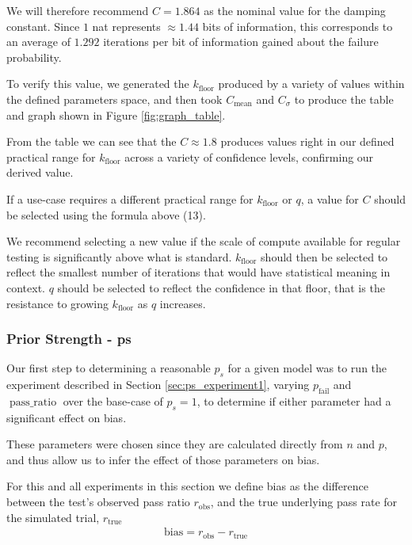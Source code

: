 We will therefore recommend $C = 1.864$ as the nominal value for the damping constant. Since $1$ nat represents $\approx 1.44$ bits of information, this corresponds to an average of $1.292$ iterations per bit of information gained about the failure probability.

To verify this value, we generated the $k_{\text{floor}}$ produced by a variety of values within the defined parameters space, and then took $C_{\text{mean}}$ and $C_{\sigma}$ to produce the table and graph shown in Figure \ref{fig:graph_table}.

From the table we can see that the $C \approx 1.8$ produces values right in our defined practical range for $k_{\text{floor}}$ across a variety of confidence levels, confirming our derived value.

If a use-case requires a different practical range for $k_{\text{floor}}$ or $q$, a value for $C$ should be selected using the formula above (13).

We recommend selecting a new value if the scale of compute available for regular testing is significantly above what is standard. $k_{\text{floor}}$ should then be selected to reflect the smallest number of iterations that would have statistical meaning in context. $q$ should be selected to reflect the confidence in that floor, that is the resistance to growing $k_{\text{floor}}$ as $q$ increases.


\subsubsection{Prior Strength - ps}\label{sec:derivation_ps}


Our first step to determining a reasonable $p_s$ for a given model was to run the experiment described in Section \ref{sec:ps_experiment1}, varying $p_{\text{fail}}$ and $\operatorname{pass\_ratio}$ over the base-case of $p_s = 1$, to determine if either parameter had a significant effect on bias.

These parameters were chosen since they are calculated directly from $n$ and $p$, and thus allow us to infer the effect of those parameters on bias.

For this and all experiments in this section we define bias as the difference between the test's observed pass ratio $r_\text{obs}$, and the true underlying pass rate for the simulated trial, $r_\text{true}$
\begin{align}
    \text{bias} = r_\text{obs} - r_\text{true}
\end{align}

